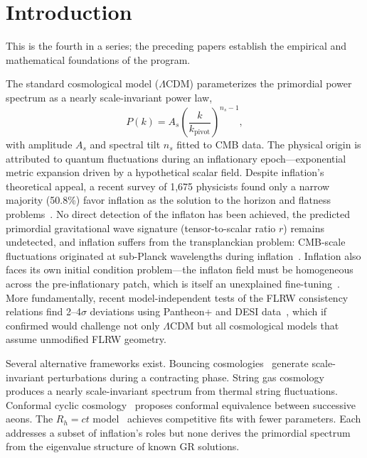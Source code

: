 \documentclass[aps,prd,twocolumn,superscriptaddress,showpacs,preprintnumbers,amsmath,amssymb,nofootinbib]{revtex4-2}
\newcommand{\lcdm}{$\Lambda$CDM}
\begin{document}
\maketitle

\section{Introduction}
\label{sec:intro}

This is the fourth in a series; the preceding papers establish the empirical and mathematical foundations of the program.

The standard cosmological model (\lcdm) parameterizes the primordial power spectrum as a nearly scale-invariant power law,
\begin{equation}
\label{eq:lcdm_pk}
P(k) = A_s \left(\frac{k}{k_\mathrm{pivot}}\right)^{n_s - 1},
\end{equation}
with amplitude $A_s$ and spectral tilt $n_s$ fitted to CMB data. The physical origin is attributed to quantum fluctuations during an inflationary epoch---exponential metric expansion driven by a hypothetical scalar field. Despite inflation's theoretical appeal, a recent survey of 1{,}675 physicists found only a narrow majority (50.8\%) favor inflation as the solution to the horizon and flatness problems~\cite{Afshordi2026}. No direct detection of the inflaton has been achieved, the predicted primordial gravitational wave signature (tensor-to-scalar ratio $r$) remains undetected, and inflation suffers from the transplanckian problem: CMB-scale fluctuations originated at sub-Planck wavelengths during inflation~\cite{BrandenbergerMartin2001}. Inflation also faces its own initial condition problem---the inflaton field must be homogeneous across the pre-inflationary patch, which is itself an unexplained fine-tuning~\cite{Ijjas2013,Brandenberger2014}. More fundamentally, recent model-independent tests of the FLRW consistency relations find 2--4$\sigma$ deviations using Pantheon+ and DESI data~\cite{KoksbangHeinesen2026a}, which if confirmed would challenge not only \lcdm{} but all cosmological models that assume unmodified FLRW geometry.

Several alternative frameworks exist. Bouncing cosmologies~\cite{Novello2008} generate scale-invariant perturbations during a contracting phase. String gas cosmology~\cite{BrandenbergerVafa1989,Nayeri2006} produces a nearly scale-invariant spectrum from thermal string fluctuations. Conformal cyclic cosmology~\cite{GurzadyanPenrose2013} proposes conformal equivalence between successive aeons. The $R_h = ct$ model~\cite{Melia2012} achieves competitive fits with fewer parameters. Each addresses a subset of inflation's roles but none derives the primordial spectrum from the eigenvalue structure of known GR solutions.
\end{document}
